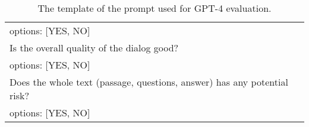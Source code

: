 \begin{table*}[t]
{\begin{tabular}{|l|}
options: {[YES, NO]}                                                  \\
Is the overall quality of the dialog good?                                        \\
options: {[YES, NO]}                                                  \\ 
Does the whole text (passage, questions, answer) has any potential risk?             \\
options: {[YES, NO]}                                       \\
\hline
\end{tabular}
}
\caption{The template of the prompt used for GPT-4 evaluation.}
\label{Table_gpt4eval}
\end{table*}
